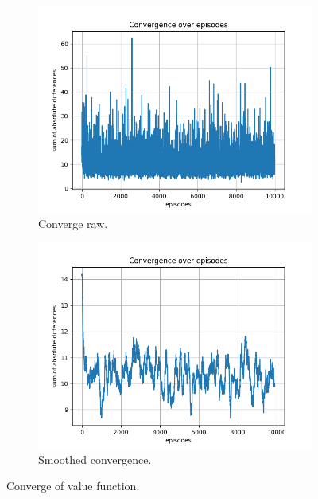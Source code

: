 \documentclass{assignment}
\begin{document}
\begin{figure}[H]
    \begin{subfigure}{0.5\textwidth}
        \includegraphics[width=\textwidth]{figures/convergence_td/alpha_sweep/convergence_TD_alpha_0.1_gamma_0.95_epislon_0.2.png}
    \caption{Converge raw.}
    \end{subfigure}\hfill
    \begin{subfigure}{0.5\textwidth}
        \includegraphics[width=\textwidth]{figures/convergence_td/alpha_sweep/convergence_TD_smoothed_alpha_0.1_gamma_0.95_epislon_0.2.png}
    \caption{Smoothed convergence.}
    \end{subfigure}
    \caption{Converge of value function.}
    \label{fig:alpha_0.1_td_learning_convergence}
\end{figure}
\end{document}
